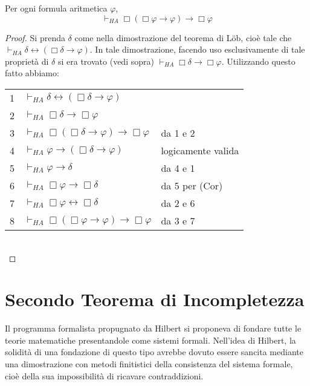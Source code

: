 \begin{thm} \label{internalized lob} Per ogni formula aritmetica $\varphi$,
$$\vdash_{HA}\Box(\Box\varphi\to\varphi)\to\Box\varphi$$
\end{thm}

\begin{proof} Si prenda $\delta$ come nella dimostrazione del teorema di L\"ob, cioè tale che $\vdash_{HA}\delta\leftrightarrow(\Box\delta\to\varphi)$. In tale dimostrazione, facendo uso esclusivamente di tale proprietà di $\delta$ si era trovato (vedi sopra) $\vdash_{HA}\Box\delta\to\Box\varphi$. Utilizzando questo fatto abbiamo:

\begin{tabular}{l l l}
1 & $\vdash_{HA}\delta\leftrightarrow(\Box\delta\to\varphi)$ 														& 									 \\
2 & $\vdash_{HA}\Box\delta\to\Box\varphi$																	& 									 \\
3 & $\vdash_{HA}\Box(\Box\delta\to\varphi)\to\Box\varphi$										&	da 1 e 2\\
4 & $\vdash_{HA}\varphi\to(\Box\delta\to\varphi)$ & logicamente valida\\
5 & $\vdash_{HA}\varphi\to\delta$															&	da 4 e 1\\
6 &	$\vdash_{HA}\Box\varphi\to\Box\delta$																	& da 5 per (Cor)		 \\
7 & $\vdash_{HA}\Box\varphi\leftrightarrow\Box\delta$																& da 2 e 6					 \\
8 & $\vdash_{HA}\Box(\Box\varphi\to\varphi)\to\Box\varphi$										&	da 3 e 7					 \\
\end{tabular}\\

\end{proof}

\section{Secondo Teorema di Incompletezza}

\noindent Il programma formalista propugnato da Hilbert si proponeva di fondare tutte le teorie matematiche presentandole come sistemi formali. Nell'idea di Hilbert, la solidità di una fondazione di questo tipo avrebbe dovuto essere sancita mediante una dimostrazione con metodi finitistici della consistenza del sistema formale, cioè della sua impossibilità di ricavare contraddizioni.

